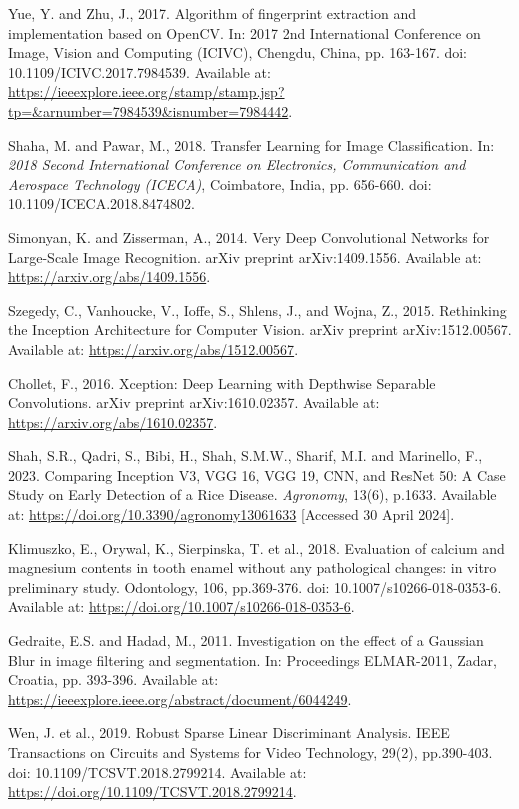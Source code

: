 \begin{thebibliography}{99}
    Yue, Y. and Zhu, J., 2017. Algorithm of fingerprint extraction and implementation based on OpenCV. In: 2017 2nd International Conference on Image, Vision and Computing (ICIVC), Chengdu, China, pp. 163-167. doi: 10.1109/ICIVC.2017.7984539. Available at: \url{https://ieeexplore.ieee.org/stamp/stamp.jsp?tp=&arnumber=7984539&isnumber=7984442}.

    Shaha, M. and Pawar, M., 2018. Transfer Learning for Image Classification. In: \textit{2018 Second International Conference on Electronics, Communication and Aerospace Technology (ICECA)}, Coimbatore, India, pp. 656-660. doi: 10.1109/ICECA.2018.8474802.

    Simonyan, K. and Zisserman, A., 2014. Very Deep Convolutional Networks for Large-Scale Image Recognition. arXiv preprint arXiv:1409.1556. Available at: \url{https://arxiv.org/abs/1409.1556}.
    
    Szegedy, C., Vanhoucke, V., Ioffe, S., Shlens, J., and Wojna, Z., 2015. Rethinking the Inception Architecture for Computer Vision. arXiv preprint arXiv:1512.00567. Available at: \url{https://arxiv.org/abs/1512.00567}.
    
    Chollet, F., 2016. Xception: Deep Learning with Depthwise Separable Convolutions. arXiv preprint arXiv:1610.02357. Available at: \url{https://arxiv.org/abs/1610.02357}.

    Shah, S.R., Qadri, S., Bibi, H., Shah, S.M.W., Sharif, M.I. and Marinello, F., 2023. Comparing Inception V3, VGG 16, VGG 19, CNN, and ResNet 50: A Case Study on Early Detection of a Rice Disease. \textit{Agronomy}, 13(6), p.1633. Available at: \url{https://doi.org/10.3390/agronomy13061633} [Accessed 30 April 2024].

    Klimuszko, E., Orywal, K., Sierpinska, T. et al., 2018. Evaluation of calcium and magnesium contents in tooth enamel without any pathological changes: in vitro preliminary study. Odontology, 106, pp.369-376. doi: 10.1007/s10266-018-0353-6. Available at: \url{https://doi.org/10.1007/s10266-018-0353-6}.

    Gedraite, E.S. and Hadad, M., 2011. Investigation on the effect of a Gaussian Blur in image filtering and segmentation. In: Proceedings ELMAR-2011, Zadar, Croatia, pp. 393-396. Available at: \url{https://ieeexplore.ieee.org/abstract/document/6044249}.

    Wen, J. et al., 2019. Robust Sparse Linear Discriminant Analysis. IEEE Transactions on Circuits and Systems for Video Technology, 29(2), pp.390-403. doi: 10.1109/TCSVT.2018.2799214. Available at: \url{https://doi.org/10.1109/TCSVT.2018.2799214}.


\end{thebibliography}
